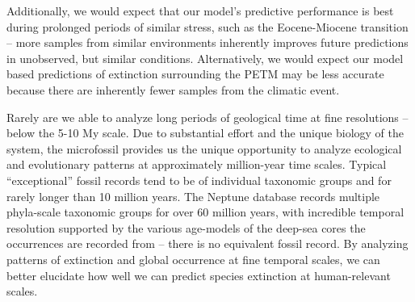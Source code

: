 \documentclass[12pt,letterpaper]{article}
\begin{document}
Additionally, we would expect that our model's predictive performance is best during prolonged periods of similar stress, such as the Eocene-Miocene transition -- more samples from similar environments inherently improves future predictions in unobserved, but similar conditions. Alternatively, we would expect our model based predictions of extinction surrounding the PETM may be less accurate because there are inherently fewer samples from the climatic event.

Rarely are we able to analyze long periods of geological time at fine resolutions -- below the 5-10 My scale. Due to substantial effort and the unique biology of the system, the microfossil provides us the unique opportunity to analyze ecological and evolutionary patterns at approximately million-year time scales. Typical ``exceptional'' fossil records tend to be of individual taxonomic groups and for rarely longer than 10 million years. The Neptune database records multiple phyla-scale taxonomic groups for over 60 million years, with incredible temporal resolution supported by the various age-models of the deep-sea cores the occurrences are recorded from -- there is no equivalent fossil record. By analyzing patterns of extinction and global occurrence at fine temporal scales, we can better elucidate how well we can predict species extinction at human-relevant scales.
\end{document}

